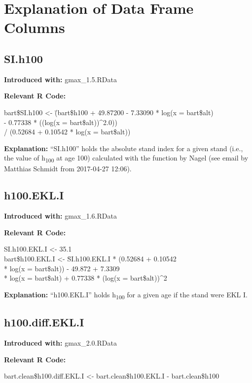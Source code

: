 \section{Explanation of Data Frame Columns}

\subsection{SI.h100}
\textbf{Introduced with:} gmax\_1.5.RData

\textbf{Relevant R Code:}

\begin{rcode}
  bart\$SI.h100 <- \=(bart\$h100 + 49.87200 - 7.33090 * log(x = bart\$alt) \\
  \>- 0.77338 * ((log(x = bart\$alt))\textasciicircum 2.0)) \\
  \>/ (0.52684 + 0.10542 * log(x = bart\$alt))
\end{rcode}

\textbf{Explanation:} ``SI.h100'' holds the absolute stand index for a given stand (i.e., the value of h\textsubscript{100} at age \SI{100}{\years}) calculated with the function by Nagel (see email by Matthias Schmidt from 2017-04-27 12:06).

\subsection{h100.EKL.I}
\textbf{Introduced with:} gmax\_1.6.RData

\textbf{Relevant R Code:}

\begin{rcode}
  SI.h100.EKL.I <- 35.1 \\
  bart\$h100.EKL.I <- \=SI.h100.EKL.I * (0.52684 + 0.10542 \\
  \>* log(x = bart\$alt)) - 49.872 + 7.3309 \\
  \>* log(x = bart\$alt) + 0.77338 * (log(x = bart\$alt))\textasciicircum 2
\end{rcode}

\textbf{Explanation:} ``h100.EKL.I'' holds h\textsubscript{100} for a given age if the stand were EKL I.

\subsection{h100.diff.EKL.I}
\textbf{Introduced with:} gmax\_2.0.RData

\textbf{Relevant R Code:}

\begin{rcode}
  bart.clean\$h100.diff.EKL.I <- bart.clean\$h100.EKL.I - bart.clean\$h100
\end{rcode}

